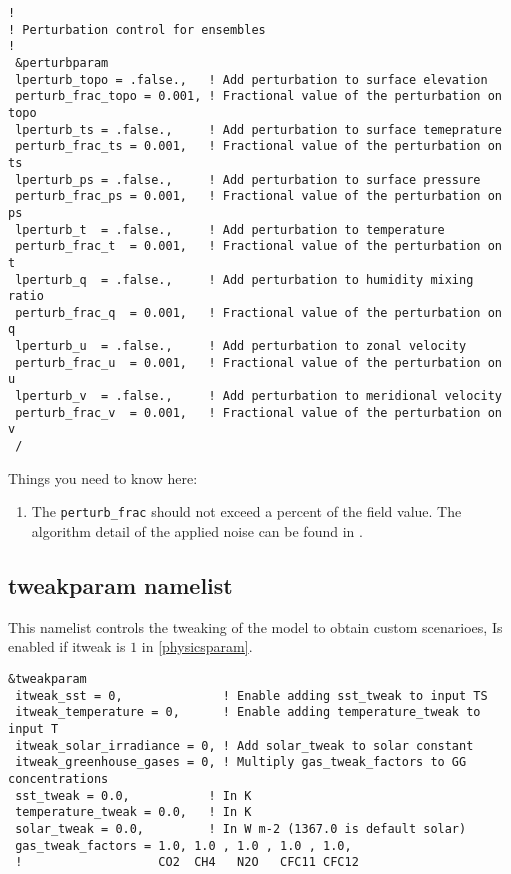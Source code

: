 {\footnotesize
\begin{Verbatim}
!
! Perturbation control for ensembles
!
 &perturbparam
 lperturb_topo = .false.,   ! Add perturbation to surface elevation
 perturb_frac_topo = 0.001, ! Fractional value of the perturbation on topo
 lperturb_ts = .false.,     ! Add perturbation to surface temeprature
 perturb_frac_ts = 0.001,   ! Fractional value of the perturbation on ts
 lperturb_ps = .false.,     ! Add perturbation to surface pressure
 perturb_frac_ps = 0.001,   ! Fractional value of the perturbation on ps
 lperturb_t  = .false.,     ! Add perturbation to temperature
 perturb_frac_t  = 0.001,   ! Fractional value of the perturbation on t
 lperturb_q  = .false.,     ! Add perturbation to humidity mixing ratio
 perturb_frac_q  = 0.001,   ! Fractional value of the perturbation on q
 lperturb_u  = .false.,     ! Add perturbation to zonal velocity
 perturb_frac_u  = 0.001,   ! Fractional value of the perturbation on u
 lperturb_v  = .false.,     ! Add perturbation to meridional velocity
 perturb_frac_v  = 0.001,   ! Fractional value of the perturbation on v
 /
\end{Verbatim}
}

Things you need to know here:

\begin{enumerate}
\item The \verb=perturb_frac= should not exceed a percent of the field value.
The algorithm detail of the applied noise can be found in \cite{tao_ense}.
\end{enumerate}

\subsection{tweakparam namelist}

This namelist controls the tweaking of the model to obtain custom scenarioes,
Is enabled if itweak is $1$ in \ref{physicsparam}.

{\footnotesize
\begin{Verbatim}
&tweakparam
 itweak_sst = 0,              ! Enable adding sst_tweak to input TS
 itweak_temperature = 0,      ! Enable adding temperature_tweak to input T
 itweak_solar_irradiance = 0, ! Add solar_tweak to solar constant
 itweak_greenhouse_gases = 0, ! Multiply gas_tweak_factors to GG concentrations
 sst_tweak = 0.0,           ! In K
 temperature_tweak = 0.0,   ! In K
 solar_tweak = 0.0,         ! In W m-2 (1367.0 is default solar)
 gas_tweak_factors = 1.0, 1.0 , 1.0 , 1.0 , 1.0,
 !                   CO2  CH4   N2O   CFC11 CFC12
\end{Verbatim}
}


